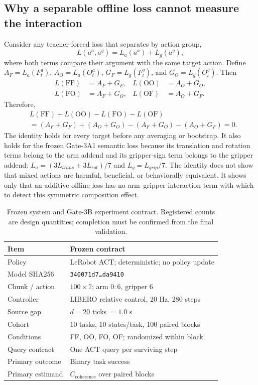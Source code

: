 \subsection{Why a separable offline loss cannot measure the interaction}

Consider any teacher-forced loss that separates by action group,
\begin{equation}
L(a^{a},a^{g})=L_a(a^{a})+L_g(a^{g}),
\end{equation}
where both terms compare their argument with the same target action.  Define
$A_F=L_a(F_t^{a})$, $A_O=L_a(O_t^{a})$, $G_F=L_g(F_t^{g})$, and
$G_O=L_g(O_t^{g})$.  Then
\begin{align}
L(\mathrm{FF}) &= A_F+G_F, &
L(\mathrm{OO}) &= A_O+G_O,\\
L(\mathrm{FO}) &= A_F+G_O, &
L(\mathrm{OF}) &= A_O+G_F.
\end{align}
Therefore,
\begin{align}
&L(\mathrm{FF})+L(\mathrm{OO})-L(\mathrm{FO})-L(\mathrm{OF})\\
&=(A_F+G_F)+(A_O+G_O)-(A_F+G_O)-(A_O+G_F)=0.
\end{align}
The identity holds for every target before any averaging or bootstrap.  It also
holds for the frozen Gate-3A1 semantic loss because its translation and rotation
terms belong to the arm addend and its gripper-sign term belongs to the gripper
addend: $L_a=(3L_{trans}+3L_{rot})/7$ and $L_g=L_{grip}/7$.  The identity does
not show that mixed actions are harmful, beneficial, or behaviorally equivalent.
It shows only that an additive offline loss has no arm--gripper interaction term
with which to detect this symmetric composition effect.

\begin{table}[t]
\caption{Frozen system and Gate-3B experiment contract.  Registered counts are
design quantities; completion must be confirmed from the final validation.}
\label{tab:system_contract}
\centering
\scriptsize
\setlength{\tabcolsep}{3.2pt}
\begin{tabular}{ll}
\toprule
Item & Frozen contract \\
\midrule
Policy & LeRobot ACT; deterministic; no policy update \\
Model SHA256 & \texttt{340071d7\ldots da9410} \\
Chunk / action & $100\times7$; arm $0{:}6$, gripper $6$ \\
Controller & LIBERO relative control, 20 Hz, 280 steps \\
Source gap & $d=20$ ticks $=1.0$ s \\
Cohort & 10 tasks, 10 states/task, 100 paired blocks \\
Conditions & FF, OO, FO, OF; randomized within block \\
Query contract & One ACT query per surviving step \\
Primary outcome & Binary task success \\
Primary estimand & $C_{\mathrm{coherence}}$ over paired blocks \\
\bottomrule
\end{tabular}
\end{table}

